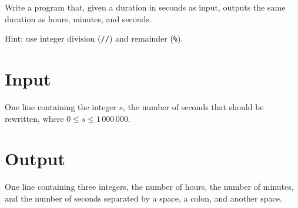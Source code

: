 
Write a program that, given a duration in seconds as input, outputs the same duration as hours, minutes, and seconds.

Hint: use integer division (\texttt{//}) and remainder (\texttt{\%}).

\section*{Input}

One line containing the integer $s$, the number of seconds that should be rewritten, 
where $0 \leq s \leq 1\,000\,000$.

\section*{Output}
One line containing three integers, the number of hours, the number of minutes,
and the number of seconds separated by a space, a colon, and another space.

